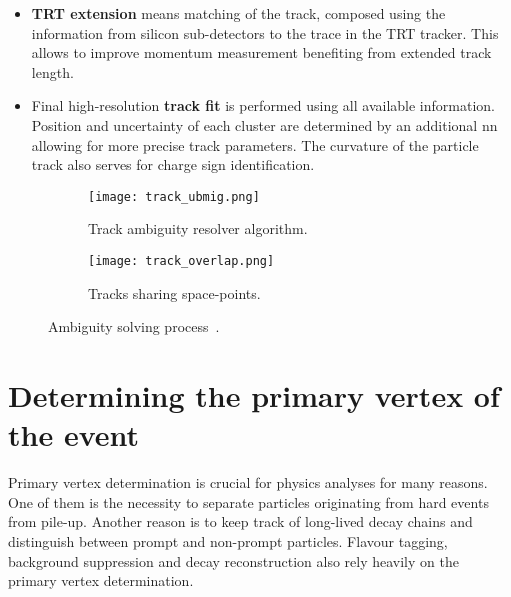 \begin{itemize}
  		The tracks are ordered by their track score and consequently fed to the ambiguity resolving sequence. A track must pass a number of kinematic cuts, impact parameters cuts, number of holes, number of clusters and shared clusters cuts, otherwise the track candidate is rejected. If a track candidate has no shared clusters with other candidates it is accepted after that. If there are merged clusters then it is up to the \gls{nn} to either accept the track, reject it or eliminate a space-point and recycle the updated track candidate (see Fig. \ref{fig::tr_ambig}). 
  		\item \textbf{TRT extension} means matching of the track, composed using the information from silicon sub-detectors to the trace in the TRT tracker. This allows to improve momentum measurement benefiting from extended track length.
  		\item Final high-resolution \textbf{track fit} is performed using all available information. Position and uncertainty of each cluster are determined by an additional \gls{nn} allowing for more precise track parameters. The curvature of the particle track also serves for charge sign identification.
  	\end{itemize}
  		\begin{figure}[htbp]
  		\begin{subfigure}[t]{0.65\textwidth}
  			\texttt{[image: track\_ubmig.png]}
  			\caption[Side view]{Track ambiguity resolver algorithm.}
  			\label{fig::tr_ambig}
  		\end{subfigure}
  		\hfill
  		\begin{subfigure}[t]{0.33\textwidth} 
  			\texttt{[image: track\_overlap.png]}
  			\caption[Share]{Tracks sharing space-points.}
  			\label{fig::tr_overlap}
  		\end{subfigure}
  		\caption{Ambiguity solving process~\cite{ATLAS:track2}.}
  		\label{fig::tr_resol}
  	\end{figure}
  \section{Determining the primary vertex of the event}
   Primary vertex determination is crucial for physics analyses for many  reasons. One of them is the necessity to separate particles originating from hard events from pile-up. Another reason is to keep track of long-lived decay chains and distinguish between prompt and non-prompt particles. Flavour tagging, background suppression and decay reconstruction also rely heavily on the primary vertex determination.
   
